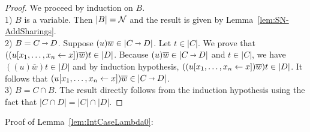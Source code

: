 \documentclass[orivec]{llncs}
\begin{document}
\begin{proof}
 We proceed by induction on $B$.
\\
1) $B$ is a variable. Then $|B| = \mathcal{N}$ and the result is given by Lemma~\ref{lem:SN-AddSharings}.
\\
2) $B= C\vlim D$.
Suppose $(u)\overline{w} \in |C\vlim D|$. Let $t\in|C|$. We prove that  $((u\share xx)\overline{w})t \in |D|$. Because $(u)\overline{w} \in |C\vlim D|$ and $t\in|C|$, we have $((u)\overline{w})t \in |D|$ and by induction hypothesis, $((u\share xx)\overline{w})t \in |D|$. It follows that $(u\share xx)\overline{w} \in |C\vlim D|$.
\\
3) $B= C\cap B$.
The result directly follows from the induction hypothesis using the fact that $|C\cap D| = |C|\cap|D|$.

\end{proof}


Proof of Lemma~\ref{lem:IntCaseLambda0}:
\end{document}
